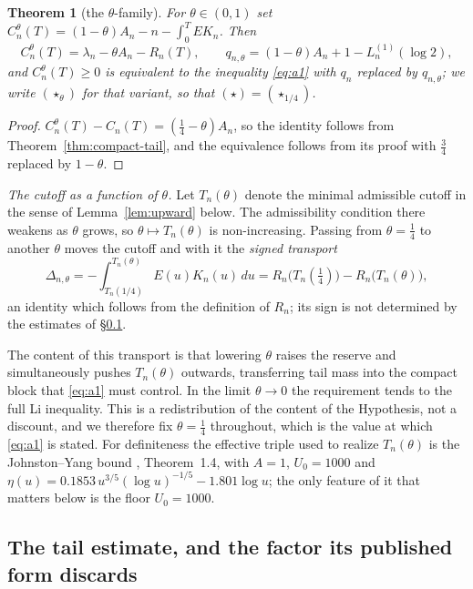 \documentclass[11pt]{amsart}
\newtheorem{theorem}{Theorem}[section]
\theoremstyle{definition}
\theoremstyle{remark}
\theoremstyle{definition}
\begin{document}
\begin{theorem}[the $\theta$-family]\label{thm:theta}
For $\theta\in(0,1)$ set
$C_n^\theta(T)=(1-\theta)A_n-n-\int_0^TE K_n$. Then
\begin{equation}\label{eq:theta}
   C_n^\theta(T)=\lambda_n-\theta A_n-R_n(T),
   \qquad
   q_{n,\theta}=(1-\theta)A_n+1-L_n^{(1)}(\log2),
\end{equation}
and $C_n^\theta(T)\ge0$ is equivalent to the inequality \eqref{eq:a1} with $q_n$ replaced by
$q_{n,\theta}$; we write $(\star_\theta)$ for that variant, so that
$(\star)=(\star_{1/4})$.
\end{theorem}

\begin{proof}
$C_n^\theta(T)-C_n(T)=(\tfrac14-\theta)A_n$, so the identity follows from
Theorem~\ref{thm:compact-tail}, and the equivalence follows from its proof with $\tfrac34$ replaced
by $1-\theta$.
\end{proof}

\emph{The cutoff as a function of $\theta$.} Let $T_n(\theta)$ denote the minimal admissible cutoff in the sense of Lemma~\ref{lem:upward}
below. The admissibility condition there weakens as $\theta$ grows, so $\theta\mapsto
T_n(\theta)$ is non-increasing. Passing from $\theta=\tfrac14$ to another $\theta$ moves the
cutoff and with it the \emph{signed transport}
\begin{equation}\label{eq:transport}
   \Delta_{n,\theta}=-\int_{T_n(1/4)}^{T_n(\theta)}E(u)K_n(u)\,du
   =R_n\bigl(T_n(\tfrac14)\bigr)-R_n\bigl(T_n(\theta)\bigr),
\end{equation}
an identity which follows from the definition of $R_n$; its sign is not determined by the
estimates of \S\ref{sec:a0}.

The content of this transport is that lowering $\theta$ raises the reserve and simultaneously
pushes $T_n(\theta)$ outwards, transferring tail mass into the compact block that
\eqref{eq:a1} must control. In the limit $\theta\to0$ the requirement tends to the full Li
inequality. This is a redistribution of the content of the Hypothesis, not a discount, and we
therefore fix $\theta=\tfrac14$ throughout, which is the value at which \eqref{eq:a1} is stated.
For definiteness the effective triple used to realize $T_n(\theta)$ is the
Johnston--Yang bound \cite{JohnstonYang}, Theorem~1.4, with
$A=1$, $U_0=1000$ and
$\eta(u)=0.1853\,u^{3/5}(\log u)^{-1/5}-1.801\log u$; the only feature of it that matters below
is the floor $U_0=1000$.

\subsection{The tail estimate, and the factor its published form discards}\label{sec:a0}
\end{document}

